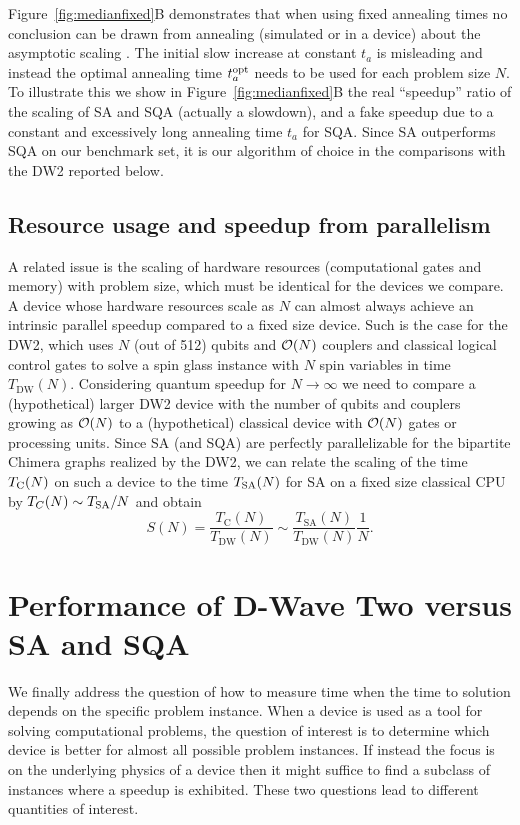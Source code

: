 Figure~\ref{fig:medianfixed}B demonstrates that when using fixed annealing times no conclusion can be drawn from annealing (simulated or in a device) about the asymptotic scaling . The initial slow increase at constant $t_a$ is misleading and instead the optimal annealing time $t_a^{\rm opt}$ needs to be used for each problem size $N$. To illustrate this we show in Figure~\ref{fig:medianfixed}B the real ``speedup'' ratio of the scaling of SA and SQA (actually a slowdown), and a  fake speedup due to a constant and excessively long annealing time $t_a$ for SQA. Since SA outperforms SQA on our benchmark set, it is our algorithm of choice in the comparisons with the DW2 reported below.

\subsection{Resource usage and speedup from parallelism}

A related issue is the scaling of hardware resources (computational gates and memory) with problem size, which must be identical for the devices we compare. A  device whose hardware resources scale as $N$ can almost always achieve an intrinsic parallel speedup compared to a fixed size device. Such is the case for the DW2, which uses $N$ (out of 512) qubits and $\mathcal{O}(N)$ couplers and classical logical control gates to solve a spin glass instance with $N$ spin variables in time $T_{\textrm{DW}}(N)$. Considering quantum speedup for $N\rightarrow\infty$ we need to compare a (hypothetical) larger DW2 device with the number of qubits and couplers growing as $\mathcal{O}(N)$  to a (hypothetical) classical device with $\mathcal{O}(N)$ gates or processing units. Since SA (and SQA) are perfectly parallelizable for the bipartite Chimera graphs realized by the DW2, we can relate the scaling of the  time $T_{\rm C}(N)$ on such a device to the time $T_{\rm SA}(N)$ for SA on a fixed size classical CPU by $T_C(N)\sim T_{\rm SA}/N$ and obtain
\begin{equation}
S(N)
= \frac{T_{\textrm{C}}(N)}{T_{\textrm{DW}}(N)}
\sim  \frac{T_{\textrm{SA}}(N)}{T_{\textrm{DW}}(N)} \frac{1}{N}.
\label{eq:parallelspeedup1}
\end{equation}
%

\section{Performance of  D-Wave Two versus SA and SQA}

We finally address the question of how to measure time when the time to solution depends on the specific problem instance. When a device is used as a tool for solving computational problems, the question of interest is to determine which device is better for almost all possible problem instances. If instead the focus is on the underlying physics of a device then it might suffice to find a subclass of instances where a speedup is exhibited. These two questions lead to different quantities of interest.

